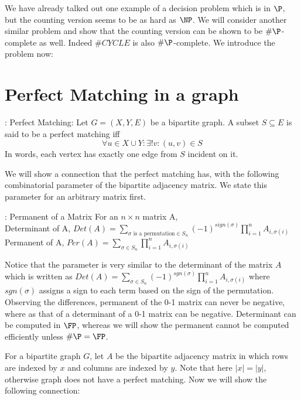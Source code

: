 We have already talked out one example of a decision problem which is in $\P$, but the counting version seems to be as hard as $\NP$. We will consider another similar problem  and show that the counting version can be shown to be $\#\P$-complete as well. Indeed $\#CYCLE$ is also $\#\P$-complete. We introduce the problem now:

\section{Perfect Matching in a graph}
	\begin{definition}: Perfect Matching: 
	Let $G=(X,Y,E)$ be a bipartite graph. A subset $S \subseteq E$ is said to be a perfect matching iff
		\[ \forall u \in X \cup Y : \exists ! v : (u,v) \in S \]
		In words, each vertex has exactly one edge from $S$ incident on it.
	\end{definition} 
We will show a connection that the perfect matching has, with the following combinatorial parameter of the bipartite adjacency matrix. We state this parameter for an arbitrary matrix first.
	\vspace{5mm}
	\begin{definition}: Permanent of a Matrix  
	For an $n\times n$ matrix A, 
\\	Determinant of A, $Det(A)=\displaystyle\sum_{\sigma\text{ is a permutation}\in S_n} (-1)^{sign(\sigma)}\prod_{i=1}^n A_{i,\sigma(i)}$
\\	Permanent of A, $Per(A)=\displaystyle\sum_{\sigma\in S_n} \prod_{i=1}^n A_{i,\sigma(i)}$
	\end{definition}
	
Notice that the parameter is very similar to the determinant of the matrix $A$ which is written as $Det(A)=\displaystyle\sum_{\sigma\in S_n} (-1)^{sgn(\sigma)} \prod_{i=1}^n A_{i,\sigma(i)}$
where $sgn(\sigma)$ assigns a sign to each term based on the sign of the permutation.
Observing the differences, permanent of the 0-1 matrix can never be negative, where as that of a determinant of a 0-1 matrix can be negative. Determinant can be computed in $\FP$, whereas we will show the permanent cannot be computed efficiently unless $\#\P = \FP$.

For a bipartite graph $G$, let $A$ be the bipartite adjacency matrix in which rows are indexed by $x$ 
and columns are indexed by $y$. Note that here $|x|=|y|$, otherwise graph does not have a perfect matching.
Now we will show the following connection:
	

